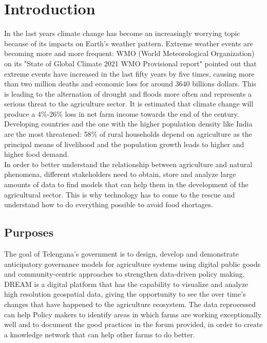 \section{Introduction}
In the last years climate change has become an increasingly worrying topic because of its impacts on Earth's weather pattern. Extreme weather events are becoming more and more frequent: WMO (World Meteorological Organization) on its "State of Global Climate 2021 WMO Provisional report" pointed out that extreme events have increased in the last fifty years by five times, causing more than two million deaths and economic loss for around 3640 billions dollars. This is leading to the alternation of drought and floods more often and represents a serious threat to the agriculture sector. It is estimated that climate change will produce a 4\%-26\% loss in net farm income towards the end of the century.\\ 
Developing countries and the one with the higher population density like India are the most threatened: 58\% of rural households depend on agriculture as the principal means of livelihood and the population growth leads to higher and higher food demand.\\
In order to better understand the relationship between agriculture and natural phenomena, different stakeholders need to obtain, store and analyze large amounts of data to find models that can help them in the development of the agricultural sector.
This is why technology has to come to the rescue and understand how to do everything possible to avoid food shortages.

\subsection{Purposes}
The goal of Telengana’s government is to design, develop and demonstrate anticipatory governance models for agriculture systems using digital public goods and community-centric approaches to strengthen data-driven policy making.
DREAM is a digital platform that has the capability to visualize and analyze high resolution geospatial data, giving the opportunity to see the over time's changes that have happened to the agriculture ecosystem.
The data reprocessed can help Policy makers to identify areas in which farms are working exceptionally well and to document the good practices in the forum provided, in order to create a knowledge network that can help other farms to do better.

